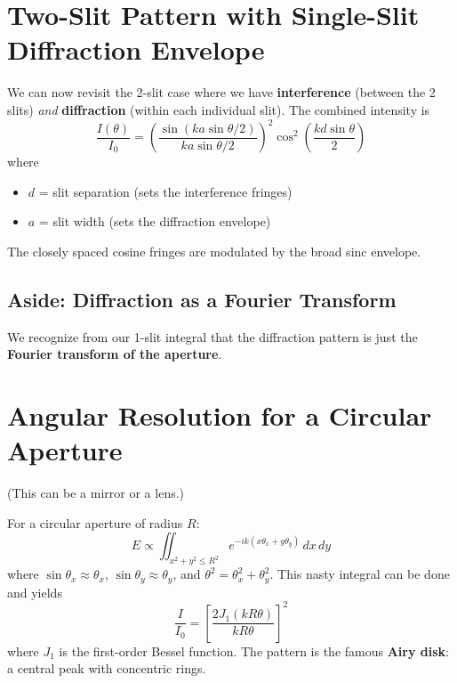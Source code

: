 \documentclass[11pt]{report}
\begin{document}
\section{Two-Slit Pattern with Single-Slit Diffraction Envelope}

We can now revisit the 2-slit case where we have \textbf{interference} (between the 2 slits) \emph{and} \textbf{diffraction} (within each individual slit). The combined intensity is
\begin{equation}
\boxed{\frac{I(\theta)}{I_0} = \left(\frac{\sin(ka\sin\theta/2)}{ka\sin\theta/2}\right)^2 \cos^2\!\left(\frac{kd\sin\theta}{2}\right)}
\end{equation}
where
\begin{itemize}
    \item $d$ = slit separation (sets the interference fringes)
    \item $a$ = slit width (sets the diffraction envelope)
\end{itemize}
The closely spaced cosine fringes are modulated by the broad sinc envelope.

\subsection*{Aside: Diffraction as a Fourier Transform}

We recognize from our 1-slit integral that the diffraction pattern is just the \textbf{Fourier transform of the aperture}.

\section{Angular Resolution for a Circular Aperture}

(This can be a mirror or a lens.)

For a circular aperture of radius $R$:
\begin{equation}
E \propto \iint_{x^2 + y^2 \le R^2} e^{-ik(x\theta_x + y\theta_y)}\,dx\,dy
\end{equation}
where $\sin\theta_x \approx \theta_x$, $\sin\theta_y \approx \theta_y$, and $\theta^2 = \theta_x^2 + \theta_y^2$. This nasty integral can be done and yields
\begin{equation}
\boxed{\frac{I}{I_0} = \left[\frac{2 J_1(kR\theta)}{kR\theta}\right]^2}
\end{equation}
where $J_1$ is the first-order Bessel function. The pattern is the famous \textbf{Airy disk}: a central peak with concentric rings.
\end{document}
